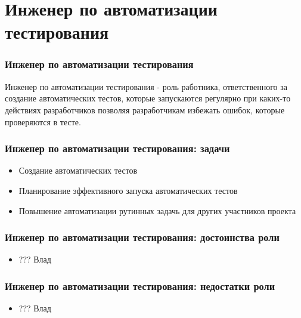 \documentclass{../industrial-development}
\begin{document}
	
	
	\section{Инженер по автоматизации тестирования}
	
	\begin{frame} \frametitle{Инженер по автоматизации тестирования}
		\begin{block}{}
			\alert {Инженер по автоматизации тестирования} - роль работника, ответственного за создание автоматических тестов, которые запускаются регулярно при каких-то действиях разработчиков позволяя разработчикам избежать ошибок, которые проверяются в тесте.
		\end{block}
		
	\end{frame}
	
	\begin{frame} \frametitle{Инженер по автоматизации тестирования: задачи}
		\begin{block}{}
			\begin{itemize}
				\item Создание автоматических тестов
				\item Планирование эффективного запуска автоматических тестов
				\item Повышение автоматизации рутинных задачь для других участников проекта		
			\end{itemize}
		\end{block}
		
	\end{frame}
	
	\begin{frame} \frametitle{Инженер по автоматизации тестирования: достоинства роли}
		\begin{block}{}
			\begin{itemize}
				\item ??? Влад
			\end{itemize}
		\end{block}
		
	\end{frame}
	
	\begin{frame} \frametitle{Инженер по автоматизации тестирования: недостатки роли}
		\begin{block}{}
			\begin{itemize}
				\item ??? Влад
			\end{itemize}
		\end{block}
		
	\end{frame}
	
\end{document}
